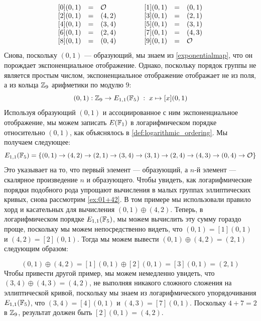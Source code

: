 \begin{example}
\begin{equation}
\begin{array}{lccr}
\begin{array}{lcl}
{}[0](0,1) &=& \mathcal{O} \\
{}[2](0,1) &=& (4, 2) \\ 
{}[4](0,1) &=& (3, 4) \\ 
{}[6](0,1) &=& (2, 4) \\ 
{}[8](0,1) &=& (0, 4) \\ 
\end{array} & & &
{}\begin{array}{lcl}
{}[1](0,1) &=& (0, 1) \\
{}[3](0,1) &=& (2, 1) \\
{}[5](0,1) &=& (3, 1) \\
{}[7](0,1) &=& (4, 3) \\
{}[9](0,1) &=& \mathcal{O}
\end{array}
\end{array}
\end{equation}
Снова, поскольку $(0,1)$ — образующий, мы знаем из \eqref{exponentialmap}, что он порождает экспоненциальное отображение. Однако, поскольку порядок группы не является простым числом, экспоненциальное отображение отображает не из поля, а из кольца $\mathbb{Z}_9$ арифметики по модулю $9$:
\begin{equation}
[\cdot](0,1): \Z_9 \to E_{1,1}(\F_5)\; : \; x\mapsto [x](0,1) 
\end{equation}
Используя образующий $(0,1)$ и ассоциированное с ним экспоненциальное отображение, мы можем записать $E(\mathbb{F}_1)$ в логарифмическом порядке относительно $(0,1)$, как объяснялось в  \ref{def:logarithmic_ordering}. Мы получаем следующее:
\begin{equation}
E_{1,1}(\mathbb{F}_5) = \{(0, 1)\to (4, 2)\to (2, 1)\to (3, 4)\to (3, 1)\to (2, 4)\to (4, 3)\to (0, 4)\to \mathcal{O} \}
\end{equation}
Это указывает на то, что первый элемент — образующий, а $n$-й элемент — скалярное произведение $n$ и образующего. Чтобы увидеть, как логарифмические порядки подобного рода упрощают вычисления в малых группах эллиптических кривых, снова рассмотрим \examplename{} \ref{ex:01+42}. В том примере мы использовали правило хорд и касательных для вычисления $(0,1)\oplus (4,2)$. Теперь, в логарифмическом порядке $E_{1,1}(\mathbb{F}_5)$, мы можем вычислить эту сумму гораздо проще, поскольку мы можем непосредственно видеть, что $(0,1)=[1](0,1)$ и $(4,2)=[2](0,1)$. Тогда мы можем вывести $(0,1)\oplus (4,2)= (2,1)$ следующим образом:

\begin{equation}
(0,1)\oplus (4,2)=[1](0,1)\oplus [2](0,1)= [3](0,1)=(2,1)
\end{equation}
Чтобы привести другой пример, мы можем немедленно увидеть, что $(3,4)\oplus (4,3) = (4,2)$, не выполняя никакого сложного сложения на эллиптической кривой, поскольку мы знаем из логарифмического упорядочивания $E_{1,1}(\mathbb{F}_5)$, что $(3,4)= [4](0,1)$ и $(4,3)= [7](0,1)$. Поскольку $4+7 = 2$ в $\mathbb{Z}_9$, результат должен быть $[2](0,1)=(4,2)$.


\end{example}
